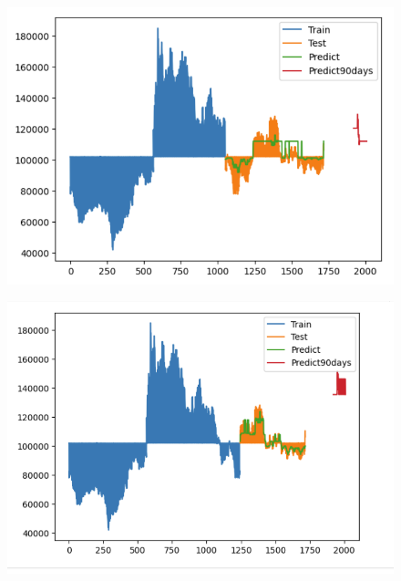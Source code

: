 \documentclass{article}
\begin{document}
\begin{multicols}{2}
\begin{figure}[H]
    \centering
    \begin{minipage}{0.15\textwidth}
    \centering
    \includegraphics[width=1\textwidth]{Image/Light GBM/LG_6_4_90.png}
   
    \label{fig:1}
    \end{minipage}%
    \begin{minipage}{0.15\textwidth}
    \centering
    \includegraphics[width=1\textwidth]{Image/Light GBM/LG_7_3_90.png}
  

\end{minipage}
\end{figure}
\end{multicols}
\end{document}
